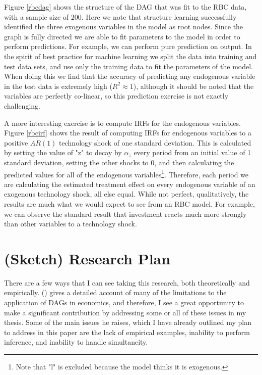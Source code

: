 \documentclass{article}
\begin{document}
Figure \ref{rbcdag} shows the structure of the DAG that was fit to the RBC data, with a sample size of 200. Here we note that structure learning successfully identified the three exogenous variables in the model as root nodes. Since the graph is fully directed we are able to fit parameters to the model in order to perform predictions. For example, we can perform pure prediction on output. In the spirit of best practice for machine learning we split the data into training and test data sets, and use only the training data to fit the parameters of the model. When doing this we find that the accuracy of predicting any endogenous variable in the test data is extremely high ($R^2 \approx 1$), although it should be noted that the variables are perfectly co-linear, so this prediction exercise is not exactly challenging. 

A more interesting exercise is to compute IRFs for the endogenous variables. Figure \ref{rbcirf} shows the result of computing IRFs for endogenous variables to a positive $AR(1)$ technology shock of one standard deviation. This is calculated by setting the value of "z" to decay by $\alpha_z$ every period from an initial value of 1 standard deviation, setting the other shocks to 0, and then calculating the predicted values for all of the endogenous variables\footnote{Note that "l" is excluded because the model thinks it is exogenous.}. Therefore, each period we are calculating the estimated treatment effect on every endogenous variable of an exogenous technology shock, all else equal. While not perfect, qualitatively, the results are much what we would expect to see from an RBC model. For example, we can observe the standard result that investment reacts much more strongly than other variables to a technology shock.

\section{(Sketch) Research Plan}
There are a few ways that I can see taking this research, both theoretically and empirically. \citeauthor{imbens2019potential} (\citeyear{imbens2019potential}) gives a detailed account of many of the limitations to the application of DAGs in economics, and therefore, I see a great opportunity to make a significant contribution by addressing some or all of these issues in my thesis. Some of the main issues he raises, which I have already outlined my plan to address in this paper are the lack of empirical examples, inability to perform inference, and inability to handle simultaneity.
\end{document}
